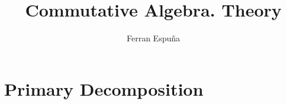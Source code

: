\documentclass[11pt]{article}
\title{Commutative Algebra. Theory}
\author{Ferran Espuña}
\theoremstyle{definition}
\begin{document}
    \maketitle

    \section{Primary Decomposition}
    
\end{document}
